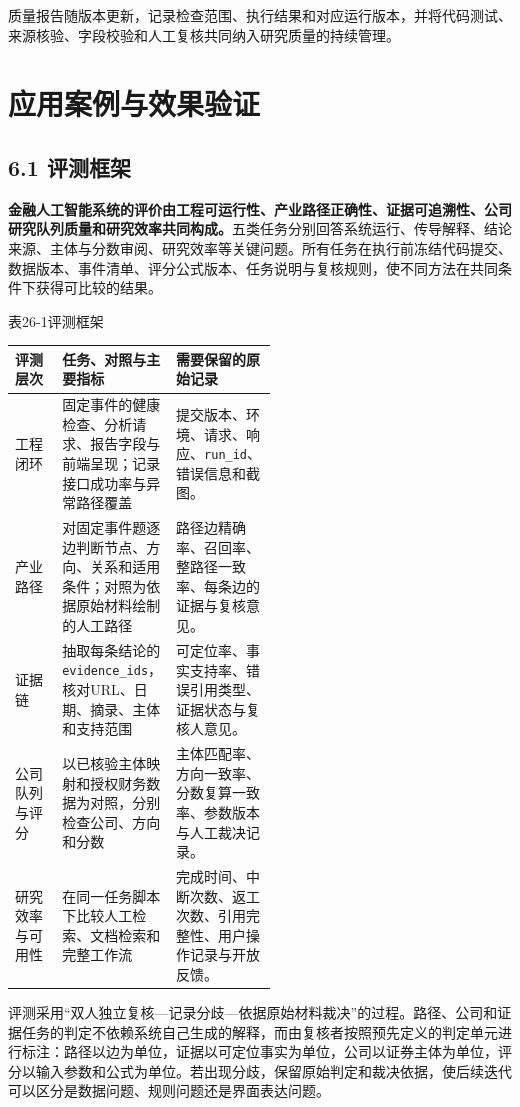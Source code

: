 质量报告随版本更新，记录检查范围、执行结果和对应运行版本，并将代码测试、来源核验、字段校验和人工复核共同纳入研究质量的持续管理。


\section{应用案例与效果验证}
\subsection*{6.1 评测框架}\label{page:26}
\noindent\textbf{金融人工智能系统的评价由工程可运行性、产业路径正确性、证据可追溯性、公司研究队列质量和研究效率共同构成。}五类任务分别回答系统运行、传导解释、结论来源、主体与分数审阅、研究效率等关键问题。所有任务在执行前冻结代码提交、数据版本、事件清单、评分公式版本、任务说明与复核规则，使不同方法在共同条件下获得可比较的结果。

\begin{center}\small 表26-1\quad 评测框架\par\vspace{1mm}
\begin{tabularx}{\linewidth}{p{0.18\linewidth}p{0.34\linewidth}X}
\toprule
评测层次 & 任务、对照与主要指标 & 需要保留的原始记录\\
\midrule
工程闭环 & 固定事件的健康检查、分析请求、报告字段与前端呈现；记录接口成功率与异常路径覆盖 & 提交版本、环境、请求、响应、\texttt{run\_id}、错误信息和截图。\\
产业路径 & 对固定事件题逐边判断节点、方向、关系和适用条件；对照为依据原始材料绘制的人工路径 & 路径边精确率、召回率、整路径一致率、每条边的证据与复核意见。\\
证据链 & 抽取每条结论的\texttt{evidence\_ids}，核对URL、日期、摘录、主体和支持范围 & 可定位率、事实支持率、错误引用类型、证据状态与复核人意见。\\
公司队列与评分 & 以已核验主体映射和授权财务数据为对照，分别检查公司、方向和分数 & 主体匹配率、方向一致率、分数复算一致率、参数版本与人工裁决记录。\\
研究效率与可用性 & 在同一任务脚本下比较人工检索、文档检索和完整工作流 & 完成时间、中断次数、返工次数、引用完整性、用户操作记录与开放反馈。\\
\bottomrule
\end{tabularx}\end{center}

评测采用“双人独立复核—记录分歧—依据原始材料裁决”的过程。路径、公司和证据任务的判定不依赖系统自己生成的解释，而由复核者按照预先定义的判定单元进行标注：路径以边为单位，证据以可定位事实为单位，公司以证券主体为单位，评分以输入参数和公式为单位。若出现分歧，保留原始判定和裁决依据，使后续迭代可以区分是数据问题、规则问题还是界面表达问题。

